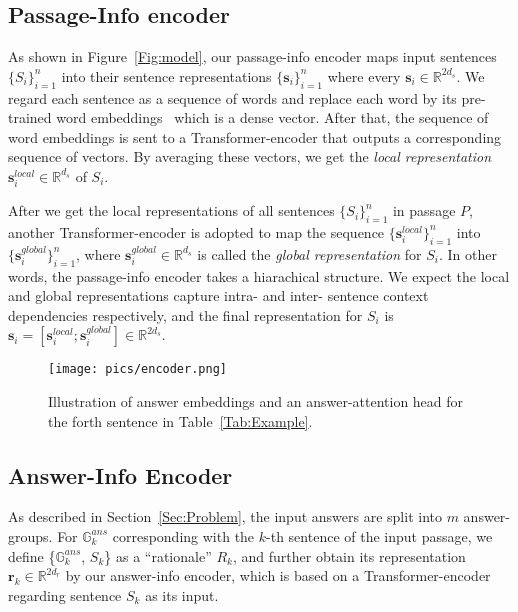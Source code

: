 \documentclass[11pt,a4paper]{article}
\begin{document}
\subsection{Passage-Info encoder}
As shown in Figure~\ref{Fig:model}, our passage-info encoder maps input sentences $\{S_i\}_{i = 1}^{n}$ into their sentence representations $\{\bm{s}_i\}_{i = 1}^{n}$ where every $\bm{s}_i \in \mathbb{R}^{2 d_s}$.
We regard each sentence as a sequence of words and replace each word by its pre-trained word embeddings~\cite{mikolov2013distributed} which is a dense vector. 
After that, the sequence of word embeddings is sent to a Transformer-encoder that outputs a corresponding sequence of vectors. By averaging these vectors, we get the \textit{local representation} $\bm{s}^{local}_i \in \mathbb{R}^{d_s}$ of $S_i$.

After we get the local representations of all sentences $\{S_i\}_{i = 1}^{n}$ in passage $P$, another Transformer-encoder is adopted to map the sequence $\{\bm{s}^{local}_i\}_{i = 1}^{n}$ into $\{\bm{s}^{global}_i\}_{i = 1}^{n}$, where $\bm{s}^{global}_i \in \mathbb{R}^{d_s}$ is called the \textit{global representation} for $S_i$.
In other words, the passage-info encoder takes a hiarachical structure.
We expect the local and global representations capture intra- and inter- sentence context dependencies respectively, and the final representation for $S_i$ is $\bm{s}_i = [\bm{s}^{local}_i; \bm{s}^{global}_i] \in \mathbb{R}^{2 d_s}$.

\begin{figure}
	\centering
	\texttt{[image: pics/encoder.png]}
	\caption{Illustration of answer embeddings and an answer-attention head for the forth sentence in Table~\ref{Tab:Example}.}
	\label{Fig:encoder}
\end{figure}

\subsection{Answer-Info Encoder} \label{Sec:AnswerEncoder}
As described in Section~\ref{Sec:Problem}, the input answers are split into $m$ answer-groups. For $\mathbb{G}^{ans}_k$ corresponding with the $k$-th sentence of the input passage, we define \{$\mathbb{G}^{ans}_k$, $S_k$\} as a ``rationale'' $R_k$, and further obtain its representation $\bm{r}_k \in \mathbb{R}^{2 d_r}$ by our answer-info encoder, which is based on a Transformer-encoder regarding sentence $S_k$ as its input.
 
\end{document}
